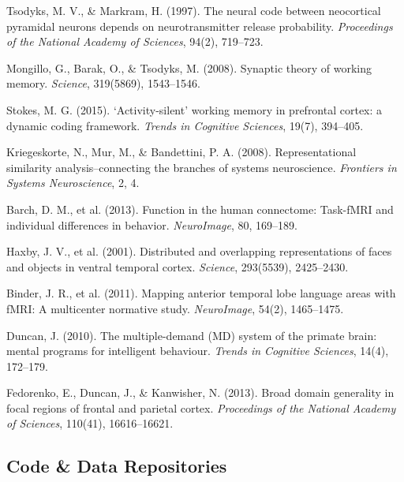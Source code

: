 \documentclass[11pt,a4paper]{article}
\begin{document}
\begin{enumerate}[label={[\arabic*]}]
    \item Tsodyks, M. V., \& Markram, H. (1997). The neural code between neocortical pyramidal neurons depends on neurotransmitter release probability. \textit{Proceedings of the National Academy of Sciences}, 94(2), 719--723.
    \item Mongillo, G., Barak, O., \& Tsodyks, M. (2008). Synaptic theory of working memory. \textit{Science}, 319(5869), 1543--1546.
    \item Stokes, M. G. (2015). ‘Activity-silent’ working memory in prefrontal cortex: a dynamic coding framework. \textit{Trends in Cognitive Sciences}, 19(7), 394--405.
    \item Kriegeskorte, N., Mur, M., \& Bandettini, P. A. (2008). Representational similarity analysis–connecting the branches of systems neuroscience. \textit{Frontiers in Systems Neuroscience}, 2, 4.
    \item Barch, D. M., et al. (2013). Function in the human connectome: Task-fMRI and individual differences in behavior. \textit{NeuroImage}, 80, 169--189.
    \item Haxby, J. V., et al. (2001). Distributed and overlapping representations of faces and objects in ventral temporal cortex. \textit{Science}, 293(5539), 2425--2430.
    \item Binder, J. R., et al. (2011). Mapping anterior temporal lobe language areas with fMRI: A multicenter normative study. \textit{NeuroImage}, 54(2), 1465--1475.
    \item Duncan, J. (2010). The multiple-demand (MD) system of the primate brain: mental programs for intelligent behaviour. \textit{Trends in Cognitive Sciences}, 14(4), 172--179.
    \item Fedorenko, E., Duncan, J., \& Kanwisher, N. (2013). Broad domain generality in focal regions of frontal and parietal cortex. \textit{Proceedings of the National Academy of Sciences}, 110(41), 16616--16621.
\end{enumerate}

\subsection{Code \& Data Repositories}
\end{document}
